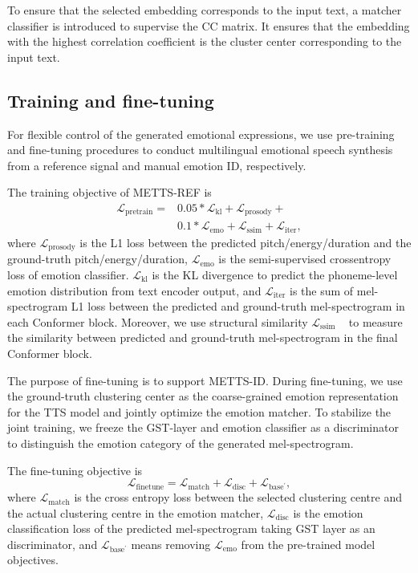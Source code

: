 \documentclass[journal,comsoc]{IEEEtran}
\begin{document}
To ensure that the selected embedding corresponds to the input text, a matcher classifier is introduced to supervise the CC matrix. It ensures that the embedding with the highest correlation coefficient is the cluster center corresponding to the input text.

\subsection{Training and fine-tuning}
For flexible control of the generated emotional expressions, we use pre-training and fine-tuning procedures to conduct multilingual emotional speech synthesis from a reference signal and manual emotion ID, respectively.

The training objective of METTS-REF is
\begin{equation}
\begin{aligned}  
\mathcal{L}_{\mathrm{pretrain}} = & 0.05 * \mathcal{L}_{\mathrm{kl}} +  \mathcal{L}_{\mathrm{prosody}} + \\
& 0.1 * \mathcal{L}_{\mathrm{emo}} + \mathcal{L}_{\mathrm{ssim}}+  \mathcal{L}_{\mathrm{iter}},
\end{aligned}\label{eq:eq1}
\end{equation}
where $\mathcal{L}_{\mathrm{prosody}}$ is the L1 loss between the predicted pitch/energy/duration and the ground-truth pitch/energy/duration, $\mathcal{L}_{\mathrm{emo}}$ is the semi-supervised crossentropy loss of emotion classifier. $\mathcal{L}_{\mathrm{kl}}$ is the KL divergence to predict the phoneme-level emotion distribution from text encoder output, and $\mathcal{L}_{\mathrm{iter}}$ is the sum of mel-spectrogram L1 loss between the predicted and ground-truth mel-spectrogram in each Conformer block. Moreover, we use structural similarity $\mathcal{L}_{\mathrm{ssim}}$ ~\cite{DBLP:journals/tip/WangBSS04} to measure the similarity between predicted and ground-truth mel-spectrogram in the final Conformer block.

The purpose of fine-tuning is to support METTS-ID. 
During fine-tuning, we use the ground-truth clustering center as the coarse-grained emotion representation for the TTS model and jointly optimize the emotion matcher. To stabilize the joint training, we freeze the GST-layer and emotion classifier as a discriminator to distinguish the emotion category of the generated mel-spectrogram.

The fine-tuning objective is
\begin{equation}   
\mathcal{L}_{\mathrm{finetune}} = \mathcal{L}_{\mathrm{match}} + \mathcal{L}_{\mathrm{disc}} + \mathcal{L}_{\mathrm{base^{'}}},
\end{equation}
where $\mathcal{L}_{\mathrm{match}}$ is the cross entropy loss between the selected clustering centre and the actual clustering centre in the emotion matcher, $\mathcal{L}_{\mathrm{disc}}$ is the emotion classification loss of the predicted mel-spectrogram taking GST layer as an discriminator, and $\mathcal{L}_{\mathrm{base^{'}}}$ means removing $\mathcal{L}_{\mathrm{emo}}$ from the pre-trained model objectives. 
\end{document}
